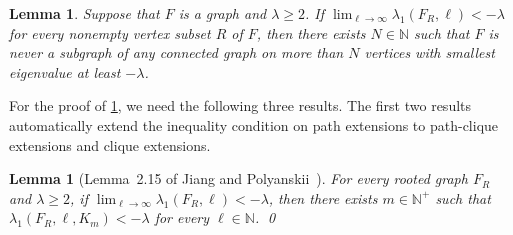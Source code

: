 \documentclass[11pt]{article}
\newtheorem{lemma}[theorem]{Lemma}
\theoremstyle{definition}
\theoremstyle{remark}
\newcommand{\la}{\lambda}
\newcommand{\N}{\mathbb{N}}
\begin{document}
\begin{lemma} \label{lem:forb-extension}
    Suppose that $F$ is a graph and $\la \ge 2$. If $\lim_{\ell \to \infty} \la_1(F_R, \ell) < -\la$ for every nonempty vertex subset $R$ of $F$, then there exists $N \in \N$ such that $F$ is never a subgraph of any connected graph on more than $N$ vertices with smallest eigenvalue at least $-\la$.
\end{lemma}

For the proof of \cref{lem:forb-extension}, we need the following three results. The first two results automatically extend the inequality condition on path extensions to path-clique extensions and clique extensions.

\begin{lemma}[Lemma~2.15 of Jiang and Polyanskii~\cite{JP25}] \label{lem:path-clique-extension}
    For every rooted graph $F_R$ and $\la \ge 2$, if $\lim_{\ell\to\infty} \la_1(F_R, \ell) < -\la$, then there exists $m \in \N^+$ such that $\la_1(F_R, \ell, K_m) < -\la$ for every $\ell \in \N$. \qed
\end{lemma}
\end{document}

